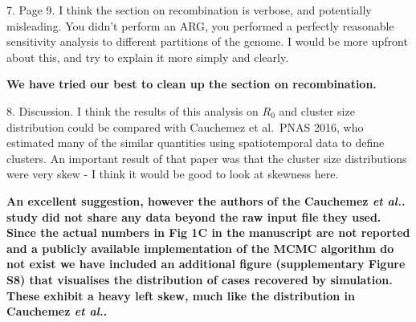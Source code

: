 \documentclass[11pt,oneside,letterpaper]{article}
\begin{document}
7. Page 9. I think the section on recombination is verbose, and potentially misleading. You didn't perform an ARG, you performed a perfectly reasonable sensitivity analysis to different partitions of the genome. I would be more upfront about this, and try to explain it more simply and clearly.

\textbf{We have tried our best to clean up the section on recombination.}

8. Discussion. I think the results of this analysis on $R_0$ and cluster size distribution could be compared with Cauchemez et al.\ PNAS 2016, who estimated many of the similar quantities using spatiotemporal data to define clusters. An important result of that paper was that the cluster size distributions were very skew - I think it would be good to look at skewness here.

\textbf{An excellent suggestion, however the authors of the Cauchemez \textit{et al.}. study did not share any data beyond the raw input file they used. Since the actual numbers in Fig 1C in the manuscript are not reported and a publicly available implementation of the MCMC algorithm do not exist we have included an additional figure (supplementary Figure S8) that visualises the distribution of cases recovered by simulation. These exhibit a heavy left skew, much like the distribution in Cauchemez \textit{et al.}.}

% 
\end{document}
